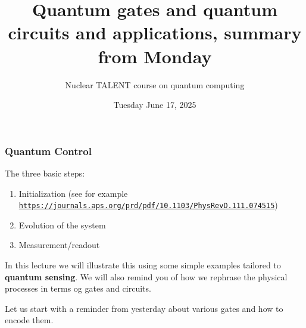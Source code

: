 \documentclass{beamer}
\begin{document}

\newcommand{\exercisesection}[1]{\subsection*{#1}}







\title{Quantum gates and quantum circuits and applications, summary from Monday}


\author{Nuclear TALENT course on quantum computing\inst{}}
\institute{}

\date{Tuesday June 17, 2025
}

\begin{frame}
\titlepage
\end{frame}

\begin{frame}
\frametitle{Quantum Control}

The three basic steps: 
\begin{enumerate}
\item Initialization (see for example \href{{https://journals.aps.org/prd/pdf/10.1103/PhysRevD.111.074515}}{\nolinkurl{https://journals.aps.org/prd/pdf/10.1103/PhysRevD.111.074515}})

\item Evolution of the system

\item Measurement/readout
\end{enumerate}

\noindent
In this lecture we will illustrate this using some simple examples
tailored to \textbf{quantum sensing}. We will also remind you of how we
rephrase the physical processes in terms og gates and circuits.

Let us start with a reminder from yesterday about various gates and how to encode them.
\end{frame}
\end{document}
